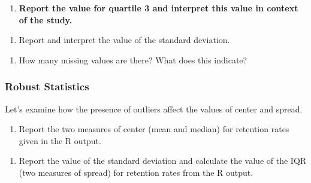 \documentclass[
]{report}
\providecommand{\tightlist}{%
  \setlength{\itemsep}{0pt}\setlength{\parskip}{0pt}}
\begin{document}
\vspace{0.3in}

\begin{enumerate}
\def\labelenumi{\arabic{enumi}.}
\setcounter{enumi}{2}
\tightlist
\item
  \textbf{Report the value for quartile 3 and interpret this value in context of the study.}
\end{enumerate}

\vspace{0.8in}

\begin{enumerate}
\def\labelenumi{\arabic{enumi}.}
\setcounter{enumi}{3}
\tightlist
\item
  Report and interpret the value of the standard deviation.
\end{enumerate}

\vspace{0.8in}

\begin{enumerate}
\def\labelenumi{\arabic{enumi}.}
\setcounter{enumi}{4}
\tightlist
\item
  How many missing values are there? What does this indicate?
\end{enumerate}

\vspace{0.3in}

\hypertarget{robust-statistics-1}{%
\subsubsection*{Robust Statistics}\label{robust-statistics-1}}

Let's examine how the presence of outliers affect the values of center and spread.

\begin{enumerate}
\def\labelenumi{\arabic{enumi}.}
\setcounter{enumi}{5}
\tightlist
\item
  Report the two measures of center (mean and median) for retention rates given in the R output.
\end{enumerate}

\vspace{0.4in}

\begin{enumerate}
\def\labelenumi{\arabic{enumi}.}
\setcounter{enumi}{6}
\tightlist
\item
  Report the value of the standard deviation and calculate the value of the IQR (two measures of spread) for retention rates from the R output.
\end{enumerate}
\end{document}
